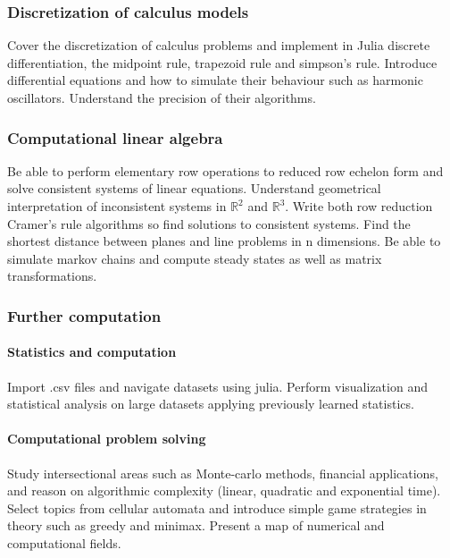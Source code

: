 \documentclass[12pt]{report}
\begin{document}
    \subsubsection{Discretization of calculus models} Cover the discretization of calculus problems and implement in Julia discrete differentiation, the midpoint rule, trapezoid rule and simpson's rule. Introduce differential equations and how to simulate their behaviour such as harmonic oscillators. Understand the precision of their algorithms.

    \subsubsection{Computational linear algebra} Be able to perform elementary row operations to reduced row echelon form and solve consistent systems of linear equations. Understand geometrical interpretation of inconsistent systems in $\mathbb{R}^2$ and $\mathbb{R}^3$. Write both row reduction Cramer's rule algorithms so find solutions to consistent systems. Find the shortest distance between planes and line problems in n dimensions. Be able to simulate markov chains and compute steady states as well as matrix transformations.

    \subsubsection{Further computation} 
        \paragraph*{Statistics and computation} Import .csv files and navigate datasets using julia. Perform visualization and statistical analysis on large datasets applying previously learned statistics.

        \paragraph*{Computational problem solving} Study intersectional areas such as Monte-carlo methods, financial applications, and reason on algorithmic complexity (linear, quadratic and exponential time). Select topics from cellular automata and introduce simple game strategies in theory such as greedy and minimax. Present a map of numerical and computational fields.
\end{document}
